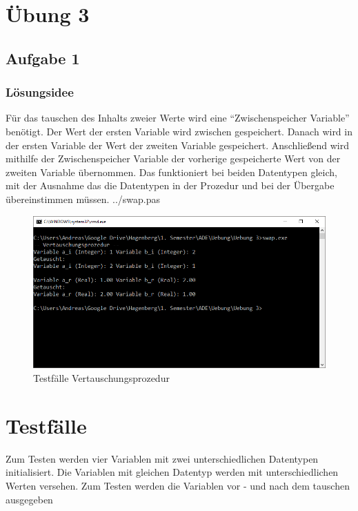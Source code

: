 \section*{Übung 3}
\subsection*{Aufgabe 1}
\subsubsection*{Lösungsidee}
Für das tauschen des Inhalts zweier Werte wird eine "`Zwischenspeicher Variable"' benötigt. Der Wert der ersten Variable wird zwischen gespeichert. Danach wird in der ersten Variable der Wert der zweiten Variable gespeichert. Anschließend wird mithilfe der Zwischenspeicher Variable der vorherige gespeicherte Wert von der zweiten Variable übernommen. Das funktioniert bei beiden Datentypen gleich, mit der Ausnahme das die Datentypen in der Prozedur und bei der Übergabe übereinstimmen müssen. 
\newline
 {../swap.pas}
\begin{figure}[H]
	\centering
	\includegraphics[scale=0.75]{./pictures/swap.png}
	\caption{Testfälle Vertauschungsprozedur}
	\label{fig: Spannweiten Berechnung}
\end{figure}

\section*{Testfälle}
Zum Testen werden vier Variablen mit zwei unterschiedlichen Datentypen initialisiert. Die Variablen mit gleichen Datentyp werden mit unterschiedlichen Werten versehen. Zum Testen werden die Variablen vor - und nach dem tauschen ausgegeben

\newpage

